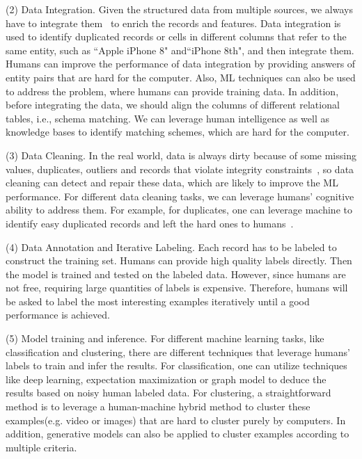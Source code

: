 (2) Data Integration.  Given the structured data from multiple sources, we always have to integrate them~\cite{DBLP:journals/vldb/ChaiLLDF18,DBLP:transitivity, DBLP:crowder} to enrich the records and features. 
Data integration is used to identify duplicated records or cells in different columns that refer to the same entity, such as ``Apple iPhone 8" and``iPhone 8th", and then integrate them. 
Humans can improve the performance of data integration by providing answers of entity pairs that are hard for the computer. Also, ML techniques can also be used to address the problem, where humans can provide training data. In addition, before integrating the data, we should align the columns of different relational tables, i.e., schema matching. We can leverage human intelligence as well as knowledge bases to identify matching schemes, which are hard for the computer.

(3) Data Cleaning. In the real world, data is always dirty because of some missing values, duplicates, outliers and records that violate integrity constraints~\cite{DBLP:crowder,DBLP:conf/sigmod/ChaiC00LM20,DBLP:journals/pvldb/ChuOMIP0Y15}, so data cleaning can detect and repair these data, which are likely to  improve the ML performance. For different data cleaning tasks, we can leverage humans' cognitive ability to address them. For example, for duplicates, one can leverage machine to identify easy duplicated records and left the hard ones to humans~\cite{DBLP:crowder}. 

(4) Data Annotation and Iterative Labeling. Each record has to be labeled to construct the training set. Humans can provide high quality labels directly. Then the model is trained and tested on the labeled data. However, since humans are not free, requiring large quantities of labels is expensive. Therefore, humans will be asked to label the most interesting examples iteratively until a good performance is achieved.

(5) Model training and inference.  For different machine learning tasks, like classification and clustering, there are different techniques that leverage humans' labels to train and infer the results. For classification, one can utilize techniques like deep learning,  expectation maximization or graph model to deduce the results based on noisy human labeled data. For clustering,   a straightforward method is to leverage a human-machine hybrid method to cluster these examples(e.g. video or images) that are hard to cluster purely by computers. In addition, generative models can also be applied to cluster examples according to multiple criteria.

